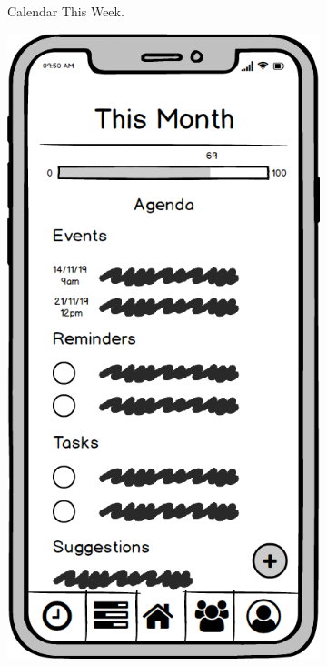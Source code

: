 \begin{figure}
\begin{subfigure}[b]{0.3\textwidth}
        \caption{Calendar This Week.}
        \label{fig:calendar_this_week}
    \end{subfigure}
    \hfill
    \begin{subfigure}[b]{0.3\textwidth}
        \centering
        \includegraphics[width=\textwidth]{./graphics/design/Dashboard (This Month Agenda View).png}

\end{subfigure}
\end{figure}
